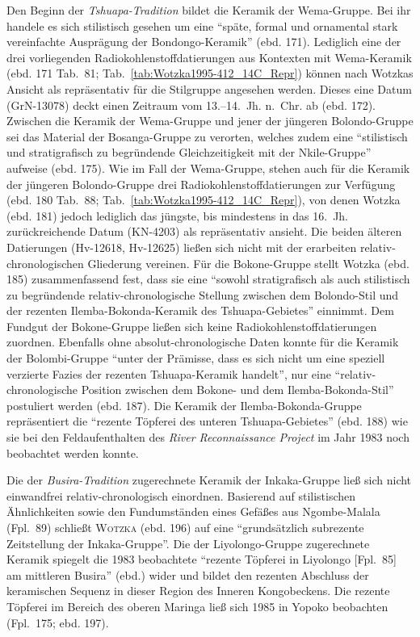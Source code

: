 Den Beginn der \textit{Tshuapa-Tradition} bildet die Keramik der Wema-Gruppe. Bei ihr handele es sich stilistisch gesehen um eine \enquote{späte, formal und ornamental stark vereinfachte Ausprägung der Bondongo-Keramik} (ebd. 171). Lediglich eine der drei vorliegenden Radiokohlenstoffdatierungen aus Kontexten mit Wema-Keramik (ebd. 171 Tab.~81; Tab.~\ref{tab:Wotzka1995-412_14C_Repr}) können nach Wotzkas Ansicht als repräsentativ für die Stilgruppe angesehen werden. Dieses eine Datum (GrN-13078) deckt einen Zeitraum vom \mbox{13.--14.~Jh.} n.~Chr. ab (ebd. 172). Zwischen die Keramik der Wema-Gruppe und jener der jüngeren Bolondo-Gruppe sei das Material der Bosanga-Gruppe zu verorten, welches zudem eine \enquote{stilistisch und stratigrafisch zu begründende Gleichzeitigkeit mit der Nkile-Gruppe} aufweise (ebd. 175). Wie im Fall der Wema-Gruppe, stehen auch für die Keramik der jüngeren Bolondo-Gruppe drei Radiokohlenstoffdatierungen zur Verfügung (ebd. 180 Tab.~88; Tab.~\ref{tab:Wotzka1995-412_14C_Repr}), von denen Wotzka (ebd. 181) jedoch lediglich das jüngste, bis mindestens in das 16.~Jh. zurückreichende Datum (KN-4203) als repräsentativ ansieht. Die beiden älteren Datierungen (Hv-12618, Hv-12625) ließen sich nicht mit der erarbeiten relativ-chronologischen Gliederung vereinen. Für die Bokone-Gruppe stellt Wotzka (ebd. 185) zusammenfassend fest, dass sie eine \enquote{sowohl stratigrafisch als auch stilistisch zu begründende relativ-chronologische Stellung zwischen dem Bolondo-Stil und der rezenten Ilemba-Bokonda-Keramik des Tshuapa-Gebietes} einnimmt. Dem Fundgut der Bokone-Gruppe ließen sich keine Radiokohlenstoffdatierungen zuordnen. Ebenfalls ohne absolut-chronologische Daten konnte für die Keramik der Bolombi-Gruppe \enquote{unter der Prämisse, dass es sich nicht um eine speziell verzierte Fazies der rezenten Tshuapa-Keramik handelt}, nur eine \enquote{relativ-chronologische Position zwischen dem Bokone- und dem Ilemba-Bokonda-Stil} postuliert werden (ebd. 187). Die Keramik der Ilemba-Bokonda-Gruppe repräsentiert die \enquote{rezente Töpferei des unteren Tshuapa-Gebietes} (ebd. 188) wie sie bei den Feldaufenthalten des \textit{River Reconnaissance Project} im Jahr 1983 noch beobachtet werden konnte.

Die der \textit{Busira-Tradition} zugerechnete Keramik der Inkaka-Gruppe ließ sich nicht einwandfrei relativ-chronologisch einordnen. Basierend auf stilistischen Ähnlichkeiten sowie den Fundumständen eines Gefäßes aus Ngombe-Malala (Fpl.~89) schließt \textsc{Wotzka} (ebd. 196) auf eine \enquote{grundsätzlich subrezente Zeitstellung der Inkaka-Gruppe}. Die der Liyolongo-Gruppe zugerechnete Keramik spiegelt die 1983 beobachtete \enquote{rezente Töpferei in Liyolongo [Fpl.~85] am mittleren Busira} (ebd.) wider und bildet den rezenten Abschluss der keramischen Sequenz in dieser Region des Inneren Kongobeckens. Die rezente Töpferei im Bereich des oberen Maringa ließ sich 1985 in Yopoko beobachten (Fpl.~175; ebd. 197). 


